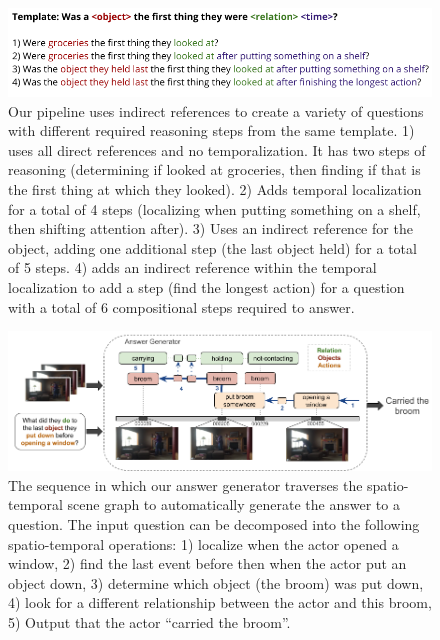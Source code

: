 \documentclass[10pt,twocolumn,letterpaper]{article}
\begin{document}
\begin{figure}[t]
\begin{center}
\includegraphics[width=0.8\linewidth]{Figures/figure_indirect.png}
\end{center}
   \caption{Our pipeline uses indirect references to create a variety of questions with different required reasoning steps from the same template. 1) uses all direct references and no temporalization. It has two steps of reasoning (determining if looked at groceries, then finding if that is the first thing at which they looked). 2) Adds temporal localization for a total of 4 steps (localizing when putting something on a shelf, then shifting attention after). 3) Uses an indirect reference for the object, adding one additional step (the last object held) for a total of 5 steps. 4) adds an indirect reference within the temporal localization to add a step (find the longest action) for a question with a total of 6 compositional steps required to answer.}
\label{template_expansion}
\end{figure}

\begin{figure}[t]
\begin{center}
\includegraphics[width=0.8\linewidth]{Figures/figure_questionGenerator.png}
\end{center}
   \caption{The sequence in which our answer generator traverses the spatio-temporal scene graph to automatically generate the answer to a question. The input question can be decomposed into the following spatio-temporal operations: 
  1) localize when the actor opened a window, 
  2) find the last event before then when the actor put an object down, 
  3) determine which object (the broom) was put down, 
  4) look for a different relationship between the actor and this broom, 
  5) Output that the actor ``carried the broom''.}
\label{answer_generator}
\end{figure}
\end{document}
